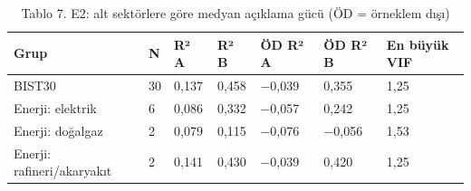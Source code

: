 \begin{table}
\caption{Tablo 7. E2: alt sektörlere göre medyan açıklama gücü (ÖD = örneklem dışı)}
\label{tab:tablo_07_e2_alt_sektorler}
\begin{tabular}{lllllll}
\toprule
Grup & N & R² A & R² B & ÖD R² A & ÖD R² B & En büyük VIF \\
\midrule
BIST30 & 30 & 0,137 & 0,458 & −0,039 & 0,355 & 1,25 \\
Enerji: elektrik & 6 & 0,086 & 0,332 & −0,057 & 0,242 & 1,25 \\
Enerji: doğalgaz & 2 & 0,079 & 0,115 & −0,076 & −0,056 & 1,53 \\
Enerji: rafineri/akaryakıt & 2 & 0,141 & 0,430 & −0,039 & 0,420 & 1,25 \\
\bottomrule
\end{tabular}
\end{table}
